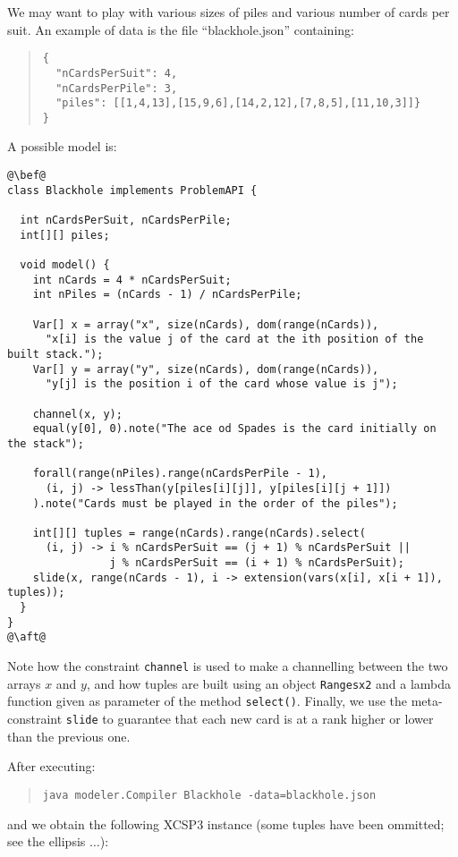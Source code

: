 \documentclass[10pt]{article}
\def\xt{{\rm XCSP3}\xspace}
\newcommand{\gb}[1]{{\tt #1}} %
\newcommand{\nn}[1]{{\tt #1}} %
\def\xt{{\rm XCSP3}\xspace}
\begin{document}
We may want to play with various sizes of piles and various number of cards per suit.
An example of data is the file ``blackhole.json'' containing:

{\small
  \begin{quote}
\begin{verbatim}
{
  "nCardsPerSuit": 4,
  "nCardsPerPile": 3,
  "piles": [[1,4,13],[15,9,6],[14,2,12],[7,8,5],[11,10,3]]}
}
\end{verbatim}
\end{quote}
}

A possible model is:
 

\begin{lstlisting}
@\bef@
class Blackhole implements ProblemAPI {

  int nCardsPerSuit, nCardsPerPile;
  int[][] piles;

  void model() {
    int nCards = 4 * nCardsPerSuit;
    int nPiles = (nCards - 1) / nCardsPerPile;
    
    Var[] x = array("x", size(nCards), dom(range(nCards)),
      "x[i] is the value j of the card at the ith position of the built stack.");
    Var[] y = array("y", size(nCards), dom(range(nCards)),
      "y[j] is the position i of the card whose value is j");
    
    channel(x, y);
    equal(y[0], 0).note("The ace od Spades is the card initially on the stack");
    
    forall(range(nPiles).range(nCardsPerPile - 1),
      (i, j) -> lessThan(y[piles[i][j]], y[piles[i][j + 1]])
    ).note("Cards must be played in the order of the piles");
    
    int[][] tuples = range(nCards).range(nCards).select(
      (i, j) -> i % nCardsPerSuit == (j + 1) % nCardsPerSuit ||
                j % nCardsPerSuit == (i + 1) % nCardsPerSuit);
    slide(x, range(nCards - 1), i -> extension(vars(x[i], x[i + 1]), tuples));
  }
}
@\aft@
\end{lstlisting}  

Note how the constraint \gb{channel} is used to make a channelling between the two arrays $x$ and $y$,
and how tuples are built using an object \nn{Rangesx2} and a lambda function given as parameter of the method \nn{select()}.
Finally, we use the meta-constraint \gb{slide} to guarantee that each new card is at a rank higher or lower than the previous one.



After executing:
\begin{quote}
\begin{verbatim}
java modeler.Compiler Blackhole -data=blackhole.json
\end{verbatim}
\end{quote}
and we obtain the following \xt instance (some tuples have been ommitted; see the ellipsis $\dots$):
\end{document}
